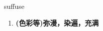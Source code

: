 
\begin{frame}
{\huge suffuse}
\begin{center}
\begin{enumerate}\Large
  \item \textbf{(色彩等)弥漫，染遍，充满}
\end{enumerate}
\end{center}
\end{frame}
